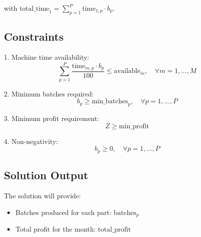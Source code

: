 \documentclass{article}
\begin{document}
with \( \text{total\_time}_1 = \sum_{p=1}^{P} \text{time}_{1,p} \cdot b_{p} \).

\subsection*{Constraints}

1. Machine time availability:
\[
\sum_{p=1}^{P} \frac{\text{time}_{m,p} \cdot b_{p}}{100} \leq \text{available}_{m}, \quad \forall m = 1, \ldots, M
\]

2. Minimum batches required:
\[
b_{p} \geq \text{min\_batches}_{p}, \quad \forall p = 1, \ldots, P
\]

3. Minimum profit requirement:
\[
Z \geq \text{min\_profit}
\]

4. Non-negativity:
\[
b_{p} \geq 0, \quad \forall p = 1, \ldots, P
\]

\subsection*{Solution Output}
The solution will provide:
\begin{itemize}
    \item Batches produced for each part: \( \text{batches}_{p} \)
    \item Total profit for the month: \( \text{total\_profit} \)
\end{itemize}
\end{document}

